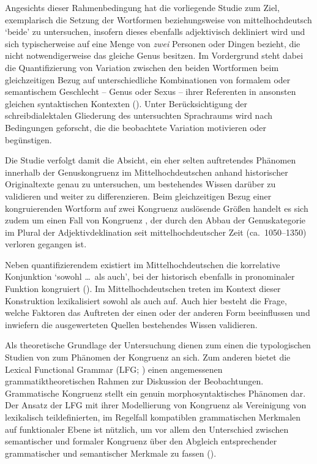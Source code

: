 Angesichts dieser Rahmenbedingung hat die vorliegende Studie zum Ziel,
exemplarisch die Setzung der Wortformen  beziehungsweise
 von mittelhochdeutsch  `beide'
zu untersuchen, insofern dieses ebenfalls adjektivisch dekliniert wird und sich
typischerweise auf eine Menge von \emph{zwei} Personen oder Dingen bezieht, die
nicht notwendigerweise das gleiche Genus besitzen. Im Vordergrund steht dabei
die Quantifizierung von Variation zwischen den beiden Wortformen beim
gleichzeitigen Bezug auf unterschiedliche Kombinationen von formalem oder
semantischem Geschlecht -- Genus oder Sexus -- ihrer Referenten in ansonsten
gleichen syntaktischen Kontexten (). Unter
Berücksichtigung der schreibdialektalen Gliederung des untersuchten Sprachraums
wird nach Bedingungen geforscht, die die beobachtete Variation motivieren oder
begünstigen.

Die Studie verfolgt damit die Absicht, ein eher selten auftretendes Phänomen
innerhalb der Genuskongruenz im Mittelhochdeutschen
anhand historischer Originaltexte genau zu untersuchen, um bestehendes Wissen
darüber zu validieren und weiter zu differenzieren. Beim gleichzeitigen Bezug
einer kongruierenden Wortform auf zwei Kongruenz auslösende Größen handelt es
sich zudem um einen  Fall von Kongruenz \autocite[8--27,
59--60]{corbett2006}, der durch den Abbau der Genuskategorie im Plural der
Adjektivdeklination seit mittelhochdeutscher Zeit (ca.\
1050--1350) verloren gegangen ist.

Neben quantifizierendem  existiert im
Mittelhochdeutschen die korrelative Konjunktion
\norm{bėide \dots\ unde} `sowohl \dots\ als auch', bei der 
historisch ebenfalls in pronominaler Funktion kongruiert
(). Im Mittelhochdeutschen
treten im Kontext dieser Konstruktion lexikalisiert sowohl
 als auch  auf. Auch hier besteht die Frage, welche
Faktoren das Auftreten der einen oder der anderen Form beeinflussen und
inwiefern die ausgewerteten Quellen bestehendes Wissen validieren.

Als theoretische Grundlage der Untersuchung dienen zum einen die typologischen
Studien von \citet{corbett1979,corbett1983,corbett1991,corbett2006} zum
Phänomen der Kongruenz an sich. Zum anderen bietet die Lexical Functional
Grammar (LFG; \cites{kaplanbresnan1982}{bresnan2001}{bresnanetal2016}) einen
angemessenen grammatiktheoretischen Rahmen zur Diskussion der Beobachtungen.
Grammatische Kongruenz stellt ein genuin morphosyntaktisches Phänomen dar. Der
Ansatz der LFG mit ihrer Modellierung von Kongruenz als Vereinigung von
lexikalisch teildefinierten, im Regelfall kompatiblen grammatischen Merkmalen
auf funktionaler Ebene ist nützlich, um vor allem den Unterschied zwischen
semantischer und formaler Kongruenz über den Abgleich entsprechender
grammatischer und semantischer Merkmale zu fassen ().

